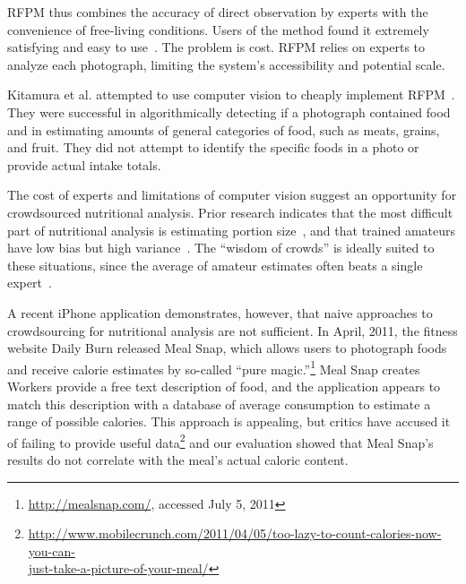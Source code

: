 RFPM thus combines the accuracy of direct observation by experts with the
convenience of free-living conditions. Users of the method found it
extremely satisfying and easy to use~\cite{martin2009novel}. The
problem is cost. RFPM relies on experts to analyze each
photograph, limiting the system's accessibility and potential
scale. %

Kitamura et al. attempted to use computer vision to cheaply implement
RFPM~\cite{kitamura2010image}.  They were successful in
algorithmically detecting if a photograph contained food and in
estimating amounts of general categories of food, such as meats,
grains, and fruit.  They did not attempt to identify the specific
foods in a photo or provide actual intake totals.

The cost of experts and limitations of computer vision suggest an
opportunity for crowdsourced nutritional analysis. Prior research indicates that
the most difficult part of nutritional analysis is estimating portion
size~\cite{martin2009novel}, and that trained amateurs have low bias
but high variance~\cite{martin2007empirical}. The ``wisdom of crowds''
is ideally suited to these situations, since the average of amateur
estimates often beats a single expert~\cite{wisdom}. 

A recent iPhone application demonstrates, however, that naive approaches to
crowdsourcing for nutritional analysis are not sufficient. In April, 2011, the fitness
website Daily Burn released Meal Snap, which allows users to
photograph foods and receive calorie estimates by so-called ``pure
magic.''\footnote{\url{http://mealsnap.com/}, accessed July 5, 2011} Meal Snap creates
 Workers
provide a free text description of food, and the application appears
to match this description with a database of average consumption to
estimate a range of possible calories. This approach is appealing, but
critics have accused it of failing to provide useful
data\footnote{\url{http://www.mobilecrunch.com/2011/04/05/too-lazy-to-count-calories-now-you-can-}\\\url{just-take-a-picture-of-your-meal/}} and our evaluation showed that Meal Snap's results do not correlate with the meal's actual caloric content.


